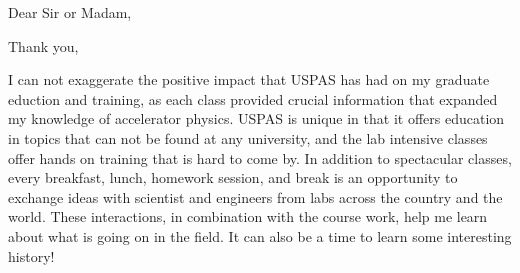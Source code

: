 \documentclass[11pt,a4paper,sans]{moderncv}        %
\begin{document}
\iffalse
\section{References}
\begin{cvcolumns}
  \cvcolumn{Category 1}{\begin{itemize}\item Linda Spentzouris \item John Power \item Larry Pinsky \end{itemize}}
  \cvcolumn{Category 2}{Amongst others:\begin{itemize}\item Person 1, and\item Person 2\end{itemize}(more upon request)}
  \cvcolumn[0.5]{All the rest \& some more}{\textit{That} person, and \textbf{those} also (all available upon request).}
\end{cvcolumns}
\fi


\clearpage
\date{August 15, 2017}
\opening{Dear Sir or Madam,}
\closing{Thank you,}
\makelettertitle

I can not exaggerate the positive impact that USPAS has had on my graduate eduction and training, 
as each class provided crucial information that expanded my knowledge of accelerator physics. 
USPAS is unique in that it offers education in 
topics that can not be found at any university, and the lab intensive classes offer hands on training 
that is hard to come by. In addition to spectacular classes, every breakfast, lunch, homework session, 
and break is an opportunity to exchange ideas with scientist and engineers from labs across the country and the world.
These interactions, in combination with the course work, help me learn about what is going on in the field.
It can also be a time to learn some interesting history!
\end{document}
